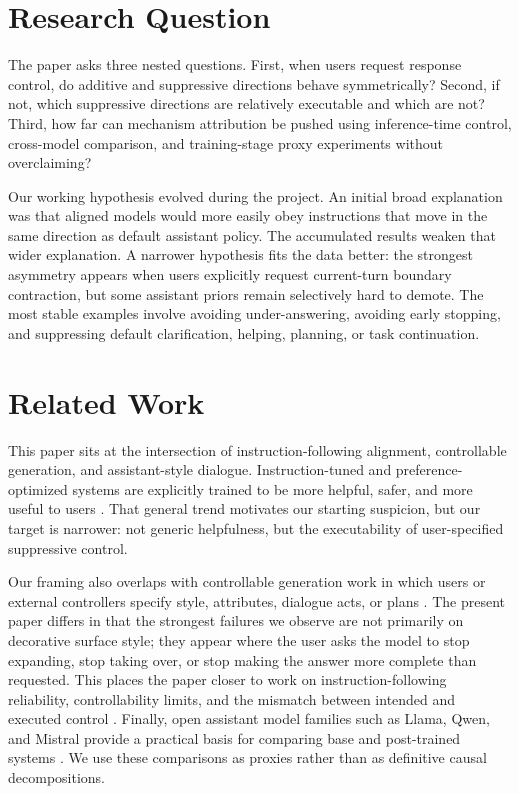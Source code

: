 \documentclass[11pt]{article}
\begin{document}
\section{Research Question}
The paper asks three nested questions. First, when users request response control, do additive and suppressive directions behave symmetrically? Second, if not, which suppressive directions are relatively executable and which are not? Third, how far can mechanism attribution be pushed using inference-time control, cross-model comparison, and training-stage proxy experiments without overclaiming?

Our working hypothesis evolved during the project. An initial broad explanation was that aligned models would more easily obey instructions that move in the same direction as default assistant policy. The accumulated results weaken that wider explanation. A narrower hypothesis fits the data better: the strongest asymmetry appears when users explicitly request current-turn boundary contraction, but some assistant priors remain selectively hard to demote. The most stable examples involve avoiding under-answering, avoiding early stopping, and suppressing default clarification, helping, planning, or task continuation.

\section{Related Work}
This paper sits at the intersection of instruction-following alignment, controllable generation, and assistant-style dialogue. Instruction-tuned and preference-optimized systems are explicitly trained to be more helpful, safer, and more useful to users \cite{ouyang2022instructgpt,rafailov2023dpo,wang2024selfrewarding}. That general trend motivates our starting suspicion, but our target is narrower: not generic helpfulness, but the executability of user-specified suppressive control.

Our framing also overlaps with controllable generation work in which users or external controllers specify style, attributes, dialogue acts, or plans \cite{zhang2023controlsurvey,gu2022survey}. The present paper differs in that the strongest failures we observe are not primarily on decorative surface style; they appear where the user asks the model to stop expanding, stop taking over, or stop making the answer more complete than requested. This places the paper closer to work on instruction-following reliability, controllability limits, and the mismatch between intended and executed control \cite{zhou2023instruction,lin2024truthfulcontrol}. Finally, open assistant model families such as Llama, Qwen, and Mistral provide a practical basis for comparing base and post-trained systems \cite{touvron2023llama2,qwen2024technical,jiang2023mistral}. We use these comparisons as proxies rather than as definitive causal decompositions.
\end{document}
